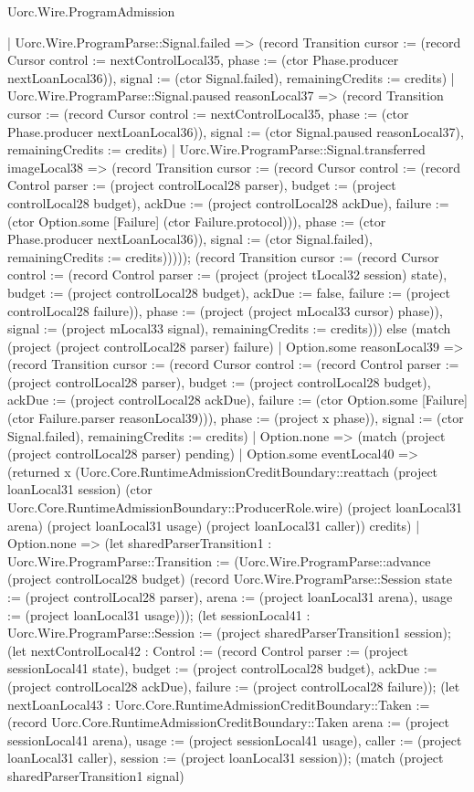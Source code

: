 \begin{lexlean}{Uorc.Wire.ProgramAdmission}
\begin{semanticmodule}
{        | Uorc.Wire.ProgramParse::Signal.failed => (record Transition {cursor := (record Cursor {control := nextControlLocal35, phase := (ctor Phase.producer nextLoanLocal36)}), signal := (ctor Signal.failed), remainingCredits := credits})
        | Uorc.Wire.ProgramParse::Signal.paused reasonLocal37 => (record Transition {cursor := (record Cursor {control := nextControlLocal35, phase := (ctor Phase.producer nextLoanLocal36)}), signal := (ctor Signal.paused reasonLocal37), remainingCredits := credits})
        | Uorc.Wire.ProgramParse::Signal.transferred imageLocal38 => (record Transition {cursor := (record Cursor {control := (record Control {parser := (project controlLocal28 parser), budget := (project controlLocal28 budget), ackDue := (project controlLocal28 ackDue), failure := (ctor Option.some [Failure] (ctor Failure.protocol))}), phase := (ctor Phase.producer nextLoanLocal36)}), signal := (ctor Signal.failed), remainingCredits := credits}))))); (record Transition {cursor := (record Cursor {control := (record Control {parser := (project (project tLocal32 session) state), budget := (project controlLocal28 budget), ackDue := false, failure := (project controlLocal28 failure)}), phase := (project (project mLocal33 cursor) phase)}), signal := (project mLocal33 signal), remainingCredits := credits}))) else (match (project (project controlLocal28 parser) failure)
        | Option.some reasonLocal39 => (record Transition {cursor := (record Cursor {control := (record Control {parser := (project controlLocal28 parser), budget := (project controlLocal28 budget), ackDue := (project controlLocal28 ackDue), failure := (ctor Option.some [Failure] (ctor Failure.parser reasonLocal39))}), phase := (project x phase)}), signal := (ctor Signal.failed), remainingCredits := credits})
        | Option.none => (match (project (project controlLocal28 parser) pending)
          | Option.some eventLocal40 => (returned x (Uorc.Core.RuntimeAdmissionCreditBoundary::reattach (project loanLocal31 session) (ctor Uorc.Core.RuntimeAdmissionBoundary::ProducerRole.wire) (project loanLocal31 arena) (project loanLocal31 usage) (project loanLocal31 caller)) credits)
          | Option.none => (let sharedParserTransition1 : Uorc.Wire.ProgramParse::Transition := (Uorc.Wire.ProgramParse::advance (project controlLocal28 budget) (record Uorc.Wire.ProgramParse::Session {state := (project controlLocal28 parser), arena := (project loanLocal31 arena), usage := (project loanLocal31 usage)})); (let sessionLocal41 : Uorc.Wire.ProgramParse::Session := (project sharedParserTransition1 session); (let nextControlLocal42 : Control := (record Control {parser := (project sessionLocal41 state), budget := (project controlLocal28 budget), ackDue := (project controlLocal28 ackDue), failure := (project controlLocal28 failure)}); (let nextLoanLocal43 : Uorc.Core.RuntimeAdmissionCreditBoundary::Taken := (record Uorc.Core.RuntimeAdmissionCreditBoundary::Taken {arena := (project sessionLocal41 arena), usage := (project sessionLocal41 usage), caller := (project loanLocal31 caller), session := (project loanLocal31 session)}); (match (project sharedParserTransition1 signal)
}
\end{semanticmodule}
\end{lexlean}
